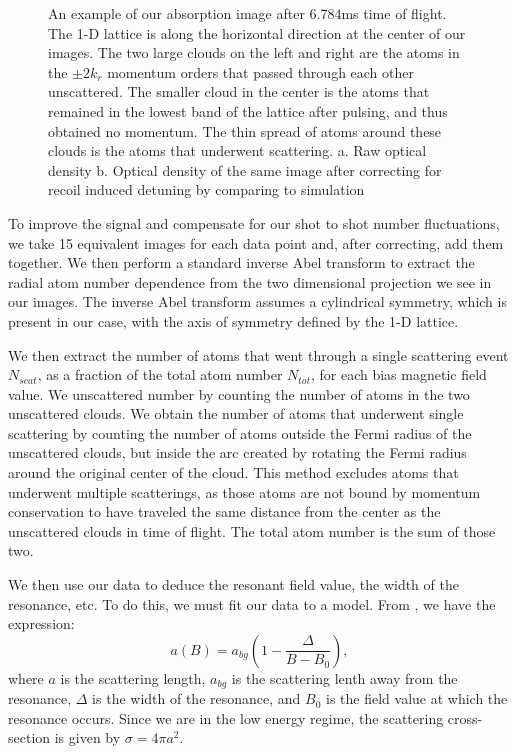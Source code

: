\documentclass[12pt]{iopart}
\begin{document}
\begin{figure}
\caption{An example of our absorption image after 6.784ms time of flight. The 1-D lattice is along the horizontal direction at the center of our images. The two large clouds on the left and right are the atoms in the $\pm 2k_r$ momentum orders that passed through each other unscattered. The smaller cloud in the center is the atoms that remained in the lowest band of the lattice after pulsing, and thus obtained no momentum. The thin spread of atoms around these clouds is the atoms that underwent scattering.  a. Raw optical density b. Optical density of the same image after correcting for recoil induced detuning by comparing to simulation}  
\label{fig:SampleCorrection}
\end{figure}
\par To improve the signal and compensate for our shot to shot number fluctuations, we take 15 equivalent images for each data point and, after correcting, add them together. We then perform a standard inverse Abel transform to extract the radial atom number dependence from the two dimensional projection we see in our images. The inverse Abel transform assumes a cylindrical symmetry, which is present in our case, with the axis of symmetry defined by the 1-D lattice. 
\par We then extract the number of atoms that went through a single scattering event $N_{scat}$, as a fraction of the total atom number $N_{tot}$, for each bias magnetic field value. We unscattered number by counting the number of atoms in the two unscattered clouds. We obtain the number of atoms that underwent single scattering by counting the number of atoms outside the Fermi radius of the unscattered clouds, but inside the arc created by rotating the Fermi radius around the original center of the cloud. This method excludes atoms that underwent multiple scatterings, as those atoms are not bound by momentum conservation to have traveled the same distance from the center as the unscattered clouds in time of flight. The total atom number is the sum of those two.
\par We then use our data to deduce the resonant field value, the width of the resonance, etc. To do this, we must fit our data to a model. From \cite{Chin10}, we have the expression:
\begin{equation}
a(B)=a_{bg}\left(1-\frac{\Delta}{B-B_0}\right),
\end{equation}
where $a$ is the scattering length, $a_{bg}$ is the scattering lenth away from the resonance, $\Delta$ is the width of the resonance, and $B_0$ is the field value at which the resonance occurs. Since we are in the low energy regime, the scattering cross-section is given by $\sigma=4\pi a^2$. 
\end{document}
